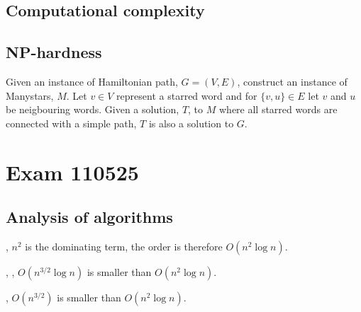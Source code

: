 \documentclass[a4paper]{article}
\newenvironment{task}[1]
{
	\begin{description}[align=right]
		\item [#1]
}{		%
	\end{description}
}
\DeclareMathOperator{\*}{\cdot}
\begin{document}
\subsection*{Computational complexity}

\begin{task}{10. (a)}
\end{task}

\subsection*{NP-hardness}

\begin{task}{12. (f)}
	\qquad Given an instance of Hamiltonian path, $G=(V,E)$, construct an instance of Manystars, $M$. Let $v\in V$ represent a starred word and for $\{v,u\}\in E$ let $v$ and $u$ be neigbouring words. Given a solution, $T$, to $M$ where all starred words are connected with a simple path, $T$ is also a solution to $G$.
\end{task}


\pagebreak
\section*{Exam 110525}
\subsection*{Analysis of algorithms}

\begin{task}{1. (a)}
	, $n^2$ is the dominating term, the order is therefore $O(n^2\log n)$.
\end{task}

\begin{task}{(b)}
	, , $O(n^{3/2}\log n)$ is smaller than $O(n^2\log n)$.
\end{task}

\begin{task}{(c)}
	, $O(n^{3/2})$ is smaller than $O(n^2\log n)$.
\end{task}

\begin{task}{2. (a)}
\end{task}

\begin{task}{3. (a)}
\end{task}

\begin{task}{(b)}
\end{task}
\end{document}
